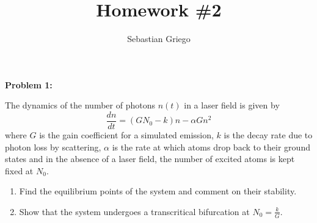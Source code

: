 \documentclass[12pt]{article}
\newenvironment{problem}[1]{
    \textbf{Problem #1:}
}{
    \rmfamily \vspace{1em}
}
\begin{document}
\title{Homework \#2}  %
\author{Sebastian Griego}  %

\begin{problem}{1}
    The dynamics of the number of photons \(n(t)\) in a laser field is given by 
    \[
        \frac{dn}{dt} = (GN_0 - k)n - \alpha G n^2
    \]
    where \(G\) is the gain coefficient for a simulated emission, \(k\) is the decay rate due to photon loss by scattering, \(\alpha\) is the rate at which atoms drop back to their ground states and in the absence of a laser field, the number of excited atoms is kept fixed at \(N_0\).
    \begin{enumerate}
        \item Find the equilibrium points of the system and comment on their stability.
        \item Show that the system undergoes a transcritical bifurcation at \(N_0 = \frac{k}{G}\).
    \end{enumerate}
\end{problem}
\end{document}

